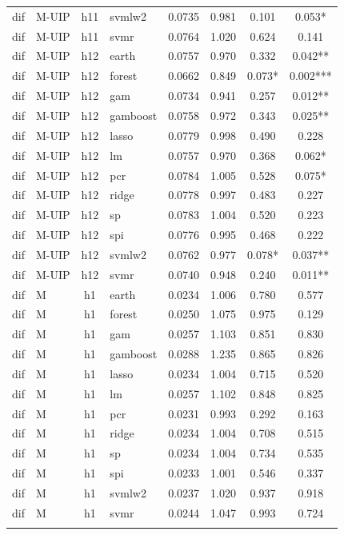 \begin{ThreePartTable}
\begin{longtable}[t]{llclcccc}
dif & M-UIP & h11 & svmlw2 & 0.0735 & 0.981 & 0.101 & 0.053*\\
dif & M-UIP & h11 & svmr & 0.0764 & 1.020 & 0.624 & 0.141\\
\addlinespace
dif & M-UIP & h12 & earth & 0.0757 & 0.970 & 0.332 & 0.042**\\
dif & M-UIP & h12 & forest & 0.0662 & 0.849 & 0.073* & 0.002***\\
dif & M-UIP & h12 & gam & 0.0734 & 0.941 & 0.257 & 0.012**\\
dif & M-UIP & h12 & gamboost & 0.0758 & 0.972 & 0.343 & 0.025**\\
dif & M-UIP & h12 & lasso & 0.0779 & 0.998 & 0.490 & 0.228\\
dif & M-UIP & h12 & lm & 0.0757 & 0.970 & 0.368 & 0.062*\\
dif & M-UIP & h12 & pcr & 0.0784 & 1.005 & 0.528 & 0.075*\\
dif & M-UIP & h12 & ridge & 0.0778 & 0.997 & 0.483 & 0.227\\
dif & M-UIP & h12 & sp & 0.0783 & 1.004 & 0.520 & 0.223\\
dif & M-UIP & h12 & spi & 0.0776 & 0.995 & 0.468 & 0.222\\
dif & M-UIP & h12 & svmlw2 & 0.0762 & 0.977 & 0.078* & 0.037**\\
dif & M-UIP & h12 & svmr & 0.0740 & 0.948 & 0.240 & 0.011**\\
\addlinespace
dif & M & h1 & earth & 0.0234 & 1.006 & 0.780 & 0.577\\
dif & M & h1 & forest & 0.0250 & 1.075 & 0.975 & 0.129\\
dif & M & h1 & gam & 0.0257 & 1.103 & 0.851 & 0.830\\
dif & M & h1 & gamboost & 0.0288 & 1.235 & 0.865 & 0.826\\
dif & M & h1 & lasso & 0.0234 & 1.004 & 0.715 & 0.520\\
dif & M & h1 & lm & 0.0257 & 1.102 & 0.848 & 0.825\\
dif & M & h1 & pcr & 0.0231 & 0.993 & 0.292 & 0.163\\
dif & M & h1 & ridge & 0.0234 & 1.004 & 0.708 & 0.515\\
dif & M & h1 & sp & 0.0234 & 1.004 & 0.734 & 0.535\\
dif & M & h1 & spi & 0.0233 & 1.001 & 0.546 & 0.337\\
dif & M & h1 & svmlw2 & 0.0237 & 1.020 & 0.937 & 0.918\\
dif & M & h1 & svmr & 0.0244 & 1.047 & 0.993 & 0.724\\
\addlinespace

\end{longtable}
\end{ThreePartTable}
